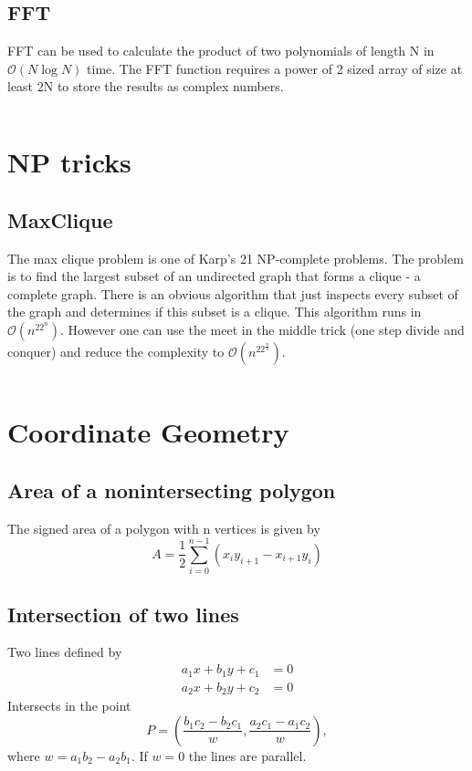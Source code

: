 \documentclass[8pt,a4paper,landscape,oneside]{amsart}
\newcommand{\codej}[1]{\inputminted[fontsize=\large,tabsize=2,baselinestretch=1]{java}{code/#1}}
\newcommand{\codep}[1]{\inputminted[fontsize=\large,tabsize=2,baselinestretch=1]{py}{code/#1}}
\newcommand{\bigO}{\mathcal{O}}
\begin{document}
\begin{multicols*}{2}
\begin{large}
    \subsection{FFT}
        FFT can be used to calculate the product of two polynomials of length N in $\bigO(N\log N)$ time. The FFT function requires a power of 2 sized array of size at least 2N to store the results as complex numbers.
        \codep{Etc/fft.py}

\section{NP tricks}
    \subsection{MaxClique}
        The max clique problem is one of Karp's 21 NP-complete problems. The problem is to find the largest subset of an undirected graph that forms a clique - a complete graph. There is an obvious algorithm that just inspects every subset of the graph and determines if this subset is a clique. This algorithm runs in $\bigO(n^22^n)$. However one can use the meet in the middle trick (one step divide and conquer) and reduce the complexity to $\bigO(n^22^{\frac{n}{2}})$.
        \codej{NP/MaxClique.java}
\section{Coordinate Geometry}
    \subsection{Area of a nonintersecting polygon}
        The signed area of a polygon with n vertices is given by 
        $$A = \frac{1}{2}\sum_{i=0}^{n-1}(x_iy_{i+1} - x_{i+1}y_i)$$
    \subsection{Intersection of two lines}
        Two lines defined by 
        \begin{align*}
            a_1x + b_1y + c_1 &= 0 \\
            a_2x + b_2y + c_2 &= 0 
        \end{align*}
        Intersects in the point 
        $$P = (\frac{b_1c_2 - b_2c_1}{w}, \frac{a_2c_1 - a_1c_2}{w}),$$
        where $w = a_1b_2 - a_2b_1$. If $w = 0$ the lines are parallel.

\end{large}
\end{multicols*}
\end{document}
